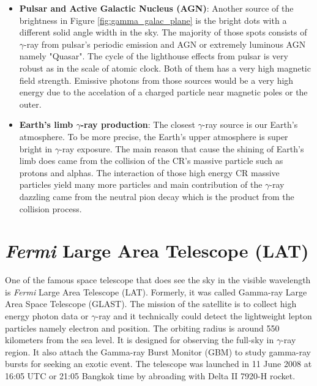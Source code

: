 \begin{itemize}
    \item \textbf{Pulsar and Active Galactic Nucleus (AGN)}: 
    Another source of the brightness in Figure \ref{fig:gamma_galac_plane}
    is the bright dots with a different solid angle width in the sky.
    The majority of those spots consists of $\gamma$-ray from 
    pulsar's periodic emission and AGN or extremely luminous AGN
    namely "Quasar". The cycle of the lighthouse effects from pulsar 
    is very robust as in the scale of atomic clock. Both of them 
    has a very high magnetic field strength. Emissive photons from 
    those sources would be a very high energy due to the accelation 
    of a charged particle near magnetic poles or the outer.


    \item \textbf{Earth's limb $\gamma$-ray production}:
    The closest $\gamma$-ray source is our Earth's atmosphere.
    To be more precise, the Earth's upper atmosphere is super bright 
    in $\gamma$-ray exposure. The main reason that cause the shining 
    of Earth's limb does came from the collision of the CR's massive
    particle such as protons and alphas. The interaction of those high 
    energy CR massive particles yield many more particles and main 
    contribution of the $\gamma$-ray dazzling came from the neutral pion
    decay which is the product from the collision process.

\end{itemize}



\section{\textit{Fermi} Large Area Telescope (LAT)}
One of the famous space telescope that does see the sky in the 
visible wavelength is \textit{Fermi} Large Area Telescope (LAT).
Formerly, it was called Gamma-ray Large Area Space Telescope (GLAST).
The mission of the satellite is to collect high energy photon data 
or $\gamma$-ray and it technically could detect the lightweight
lepton particles namely electron and position.
The orbiting radius is around 550 kilometers
from the sea level. It is designed for observing the full-sky in 
$\gamma$-ray region. It also attach the Gamma-ray Burst Monitor (GBM) to study gamma-ray
bursts for seeking an exotic event. The telescope was launched in 
11 June 2008 at 16:05 UTC or 21:05 Bangkok time by abroading with 
Delta II 7920-H rocket.


